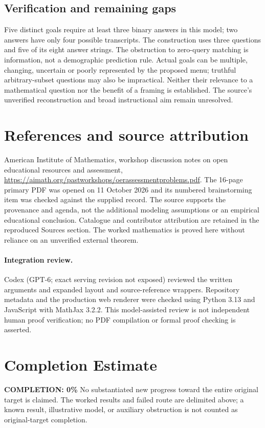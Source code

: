 \documentclass[11pt]{article}
\begin{document}
\subsection{Verification and remaining gaps}
Five distinct goals require at least three binary answers in this model; two answers have only four possible transcripts. The construction uses three questions and five of its eight answer strings. The obstruction to zero-query matching is information, not a demographic prediction rule. Actual goals can be multiple, changing, uncertain or poorly represented by the proposed menu; truthful arbitrary-subset questions may also be impractical. Neither their relevance to a mathematical question nor the benefit of a framing is established. The source's unverified reconstruction and broad instructional aim remain unresolved.

\section{References and source attribution}
American Institute of Mathematics, workshop discussion notes on open educational resources and assessment, \url{https://aimath.org/pastworkshops/oerassessmentproblems.pdf}. The 16-page primary PDF was opened on 11 October 2026 and its numbered brainstorming item was checked against the supplied record. The source supports the provenance and agenda, not the additional modeling assumptions or an empirical educational conclusion. Catalogue and contributor attribution are retained in the reproduced Sources section. The worked mathematics is proved here without reliance on an unverified external theorem.


\paragraph{Integration review.} Codex (GPT-6; exact serving revision not exposed) reviewed the written arguments and expanded layout and source-reference wrappers. Repository metadata and the production web renderer were checked using Python 3.13 and JavaScript with MathJax 3.2.2. This model-assisted review is not independent human proof verification; no PDF compilation or formal proof checking is asserted.

\section{Completion Estimate}
\noindent\textbf{COMPLETION: 0\%}
No substantiated new progress toward the entire original target is claimed. The worked results and failed route are delimited above; a known result, illustrative model, or auxiliary obstruction is not counted as original-target completion.
\end{document}
